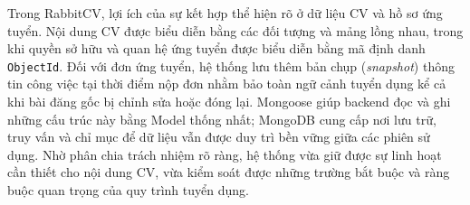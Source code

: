 Trong RabbitCV, lợi ích của sự kết hợp thể hiện rõ ở dữ liệu CV và hồ sơ ứng tuyển. Nội dung CV được biểu diễn bằng các đối tượng và mảng lồng nhau, trong khi quyền sở hữu và quan hệ ứng tuyển được biểu diễn bằng mã định danh \texttt{ObjectId}. Đối với đơn ứng tuyển, hệ thống lưu thêm bản chụp (\textit{snapshot}) thông tin công việc tại thời điểm nộp đơn nhằm bảo toàn ngữ cảnh tuyển dụng kể cả khi bài đăng gốc bị chỉnh sửa hoặc đóng lại. Mongoose giúp backend đọc và ghi những cấu trúc này bằng Model thống nhất; MongoDB cung cấp nơi lưu trữ, truy vấn và chỉ mục để dữ liệu vẫn được duy trì bền vững giữa các phiên sử dụng. Nhờ phân chia trách nhiệm rõ ràng, hệ thống vừa giữ được sự linh hoạt cần thiết cho nội dung CV, vừa kiểm soát được những trường bắt buộc và ràng buộc quan trọng của quy trình tuyển dụng.







